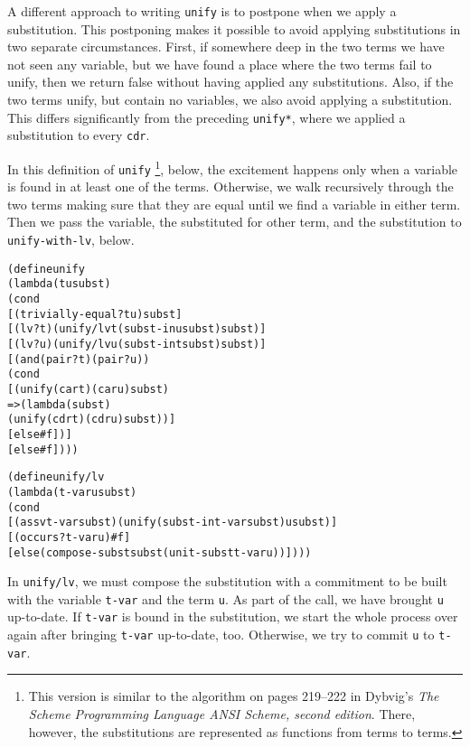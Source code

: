 A different approach to writing \texttt{unify} is to postpone when we
apply a substitution.  This postponing makes it possible to avoid
applying substitutions in two separate circumstances.  First, if
somewhere deep in the two terms we have not seen any variable, but we
have found a place where the two terms fail to unify, then we return
false without having applied any substitutions.  Also, if the two
terms unify, but contain no variables, we also avoid applying a
substitution.  This differs significantly from the preceding
\texttt{unify*}, where we applied a substitution to every
\texttt{cdr}.

In this definition of \texttt{unify}
\footnote{This version is similar to the algorithm on pages 219--222 in Dybvig's
\emph{The Scheme Programming Language ANSI Scheme, second edition}. There,
however, the substitutions are represented as functions from terms to
terms.}, below, the excitement happens only when a variable is found in at
least one of the terms.  Otherwise, we walk recursively through the two
terms making sure that they are equal until we find a variable in either
term. Then we pass the variable, the substituted for other term, and
the substitution to \texttt{unify-with-lv}, below.

\begin{alltt}
(define unify
  (lambda (t u subst)
    (cond
      [(trivially-equal? t u) subst]
      [(lv? t) (unify/lv t (subst-in u subst) subst)]
      [(lv? u) (unify/lv u (subst-in t subst) subst)]
      [(and (pair? t) (pair? u))
       (cond
         [(unify (car t) (car u) subst)
          => (lambda (subst)
               (unify (cdr t) (cdr u) subst))]
         [else #f])]
      [else #f])))
\end{alltt}

\begin{alltt}
(define unify/lv
  (lambda (t-var u subst)
    (cond
      [(assv t-var subst) (unify (subst-in t-var subst) u subst)]
      [(occurs? t-var u) #f]
      [else (compose-subst subst (unit-subst t-var u))])))
\end{alltt}

In \texttt{unify/lv}, we must compose the substitution with a
commitment to be built with the variable \texttt{t-var} and the term
\texttt{u}.  As part of the call, we have brought \texttt{u}
up-to-date.  If \texttt{t-var} is bound in the substitution, we start
the whole process over again after bringing \texttt{t-var} up-to-date,
too.  Otherwise, we try to commit \texttt{u} to \texttt{t-var}.

